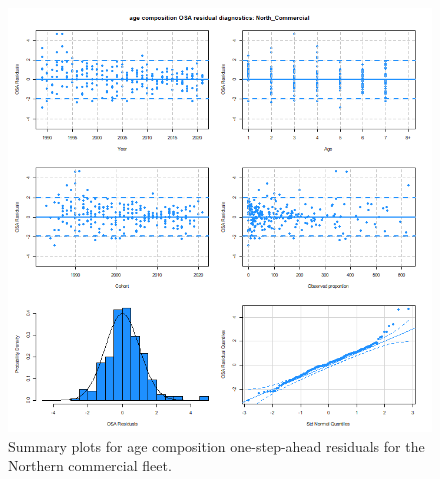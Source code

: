 \documentclass[
]{article}
\begin{document}
\begin{figure}

{\centering \includegraphics[width=1\linewidth]{../2023.RT.Runs/Run34/plots_png/diagnostics/OSA_resid_paa_6panel_North_Commercial} 

}

\caption{Summary plots for age composition one-step-ahead residuals for the Northern commercial fleet.}\label{fig:osa-North-comm-paa-summ}
\end{figure}
\end{document}
